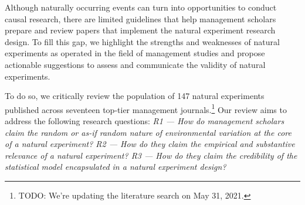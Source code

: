 \documentclass[nobib]{tufte-handout}
\newcommand{\todo}[1]{}
\renewcommand{\todo}[1]{{\color{red} TODO: {#1}}}
\begin{document}
\begin{refsection}
Although naturally occurring events can turn into opportunities to conduct
causal research, there are limited guidelines that help management scholars
prepare and review papers that implement the natural experiment research design.
To fill this gap, we highlight the strengths and weaknesses of natural
experiments as operated in the field of management studies and propose
actionable suggestions to assess and communicate the validity of natural
experiments.

To do so, we critically review the population of 147 natural experiments
published across seventeen top-tier management journals.\footnote{\todo{We're
updating the literature search on May 31, 2021.}} Our review aims
to address the following research questions: \emph{R1 --- How do management
scholars claim the random or as-if random nature of environmental variation at
the core of a natural experiment? R2 --- How do they claim the empirical and
substantive relevance of a natural experiment? R3 --- How do they claim the
credibility of the statistical model encapsulated in a natural experiment
design?}





\end{refsection}
\end{document}
